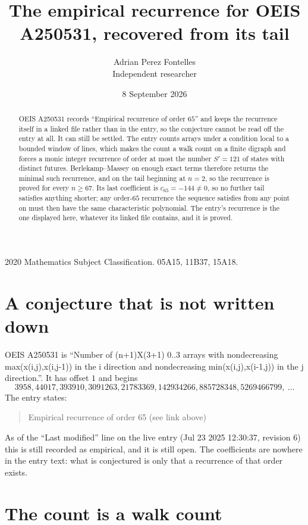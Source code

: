 \documentclass[11pt,a4paper]{article}
\title{The empirical recurrence for OEIS A250531, recovered from its tail}
\author{Adrian Perez Fontelles\\ \small Independent researcher}
\date{8 September 2026}
\theoremstyle{plain}
\theoremstyle{definition}
\begin{document}
\maketitle

\begin{abstract}
OEIS A250531 records ``Empirical recurrence of order $65$'' and keeps the recurrence itself in
a linked file rather than in the entry, so the conjecture cannot be read off the entry at all.
It can still be settled. The entry counts arrays under a condition local to a bounded window of
lines, which makes the count a walk count on a finite digraph and forces a monic integer
recurrence of order at most the number $S'=121$ of states with distinct futures. Berlekamp--Massey on
enough exact terms therefore returns the minimal such recurrence, and on the tail beginning at $n=2$, so the recurrence is proved for every $n\ge67$.
Its last coefficient is $c_{65}=-144\neq0$, so no further tail satisfies anything
shorter; any order-$65$ recurrence the sequence satisfies from any point on must then have
the same characteristic polynomial. The entry's recurrence is the one displayed here, whatever
its linked file contains, and it is proved.
\end{abstract}

\noindent\small 2020 Mathematics Subject Classification. 05A15, 11B37, 15A18.\normalsize

\section{A conjecture that is not written down}

OEIS A250531 is ``Number of (n+1)X(3+1) 0..3 arrays with nondecreasing max(x(i,j),x(i,j-1)) in the i direction and nondecreasing min(x(i,j),x(i-1,j)) in the j direction.''. It has offset $1$ and begins
\[
3958, 44017, 393910, 3091263, 21783369, 142934266, 885728348, 5269466799,\ \dots
\]
The entry states:
\begin{quote}
Empirical recurrence of order 65 (see link above)
\end{quote}
As of the ``Last modified'' line on the live entry (Jul 23 2025 12:30:37, revision 6)
this is still recorded as empirical, and it is still open. The coefficients are nowhere in the
entry text: what is conjectured is only that a recurrence of that order exists.

\section{The count is a walk count}
\end{document}
